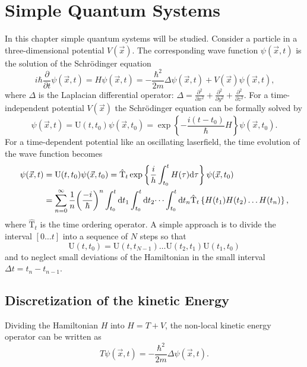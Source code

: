 \documentclass[twoside,        %
			   12pt,			%
               BCOR10mm,       %
               ngerman,english  %
               ]{scrartcl}
\begin{document}

\section{Simple Quantum Systems}\label{1}
In this chapter simple quantum systems will be studied. Consider a particle in a three-dimensional potential $V(\vec{x})$. The corresponding wave function $\psi(\vec{x}, t)$ is the solution of the Schrödinger equation
\begin{equation}
  i\hbar \frac{\partial}{\partial t} \psi(\vec{x}, t) = H \psi(\vec{x}, t) = - \frac{\hbar^2}{2m}	\Delta \psi(\vec{x}, t)+  V(\vec{x}) \psi(\vec{x}, t) \text{,}
\end{equation}
where $\Delta$ is the Laplacian differential operator: $\Delta = \frac{\partial^2}{\partial x^2} +\frac{\partial^2}{\partial y^2} + \frac{\partial^2}{\partial z^2} $. For a time-independent potential $V(\vec{x})$ the Schrödinger equation can be formally solved by 
\begin{equation}
     \psi(\vec{x}, t) = \text{U}(t, t_0) \psi(\vec{x}, t_0)   = \exp \left\{ - \frac{i(t-t_0) }{\hbar} H \right\}  \psi(\vec{x}, t_0) \text{.}
\end{equation} 
For a time-dependent potential like an oscillating laserfield, the time evolution of the wave function becomes
\begin{align}
   \psi(\vec{x}, t) &= \text{U}(t, t_0) \psi(\vec{x}, t_0)  = \hat{\text{T}}_t  \exp \left\{ \frac{i}{h} \int_{t_0}^t H(\tau) \mathrm{d} \tau \right \}  \psi(\vec{x}, t_0)  \\
   &=  \sum_{n = 0}^\infty \frac{1}{n} {\left( \frac{- i}{\hbar} \right) }^n \int_{t_0}^t \mathrm{d} t_1\int_{t_0}^t \mathrm{d} t_2 \dots \int_{t_0}^t \mathrm{d} t_n \hat{\text{T}}_t \left\{ H(t_1)H(t_2) \dots H(t_n) \right\} \text{,} \nonumber
\end{align} 
where $\hat{\text{T}}_t$ is the time ordering operator. A simple approach is to divide the interval $[0 \dots t]$ into a sequence of $N$ steps so that
\begin{equation}
   \text{U}(t, t_0) = \text{U}(t, t_{N-1}) \dots \text{U}(t_2, t_1)\text{U}(t_1, t_0)
\end{equation}   and to neglect small deviations of the Hamiltonian in the small interval $\Delta t = t_n - t_{n-1}$.
   
\subsection{Discretization of the kinetic Energy}
Dividing the Hamiltonian $H$ into $H = T + V$, the non-local kinetic energy operator can be written as
\begin{equation}
    T \psi(\vec{x}, t) = - \frac{\hbar^2}{2m} \Delta \psi(\vec{x}, t) \text{.}
\end{equation}
    
\end{document}
